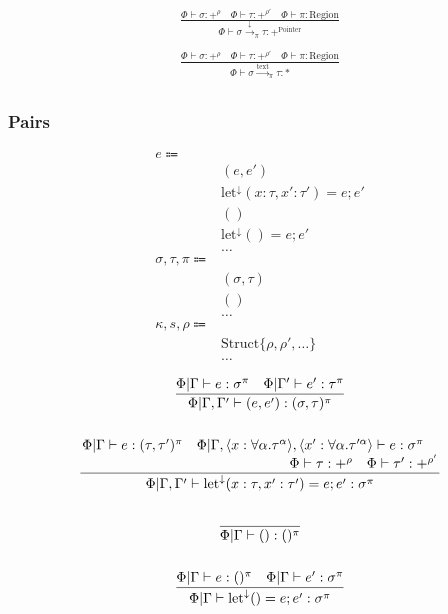 \documentclass {article}
\begin{document}
\begin{gather*}
\frac
{\Phi \vdash \sigma : +^{\rho} \quad \Phi \vdash \tau : +^{\rho'} \quad \Phi \vdash \pi : \text{Region}}
{\Phi \vdash \sigma \xrightarrow{\downarrow}_\pi \tau : +^{\text{Pointer}}} \\
\\
\frac
{\Phi \vdash \sigma : +^{\rho} \quad \Phi \vdash \tau : +^{\rho'} \quad \Phi \vdash \pi : \text{Region}}
{\Phi \vdash \sigma \xrightarrow{\text{text}}_\pi \tau : *} \\
\end{gather*}

\subsubsection{Pairs}
\begin{align*}
e \Coloneqq & \\
& (e, e') \tag{Pair Introduction} \\
& \text{let}^\downarrow (x : \tau, x' : \tau') = e; e' \tag{Pair Elimination} \\
& () \tag{Unit Introduction} \\
& \text{let}^\downarrow () = e; e' \tag{Unit Elimination} \\
& \dots \\
\sigma, \tau, \pi \Coloneqq & \\
& (\sigma, \tau) \tag{Pair} \\
& () \tag{Unit} \\
& \dots \\
\kappa, s, \rho \Coloneqq & \\
& \text{Struct} \{ \rho, \rho', \dots \} \tag{Struct Representation} \\
& \dots
\end{align*}

\begin{gather*}
\frac
{\Phi | \Gamma \vdash e : \sigma^\pi \quad \Phi | \Gamma' \vdash e' : \tau^\pi}
{\Phi | \Gamma, \Gamma' \vdash (e, e') : (\sigma, \tau)^\pi } \\
\\
\frac
{\splitfrac{\Phi | \Gamma \vdash e : (\tau, \tau')^\pi \quad \Phi | \Gamma , \langle x : \forall \alpha. \tau^\alpha \rangle, \langle x' : \forall \alpha. \tau'^\alpha \rangle \vdash e : \sigma^\pi}
{\Phi \vdash \tau : +^{\rho} \quad \Phi \vdash \tau' : +^{\rho'} }}
{\Phi | \Gamma, \Gamma' \vdash \text{let}^\downarrow (x : \tau, x' : \tau') = e; e' : \sigma^\pi} \\
\\
\frac
{}
{\Phi | \Gamma \vdash () : ()^\pi} \\
\\
\frac
{\Phi | \Gamma \vdash e : ()^\pi \quad \Phi | \Gamma \vdash e' : \sigma^\pi}
{\Phi | \Gamma \vdash \text{let}^\downarrow () = e; e' : \sigma^\pi}
\end{gather*}
\end{document}
